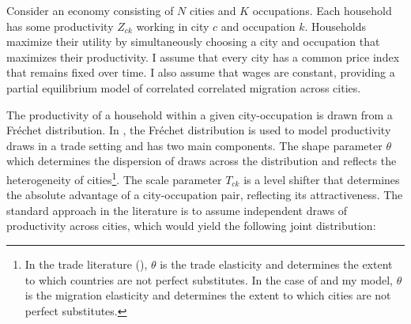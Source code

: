 \documentclass[10pt]{article}
\begin{document}


Consider an economy consisting of $N$ cities and $K$ occupations. Each household has some productivity $Z_{ck}$ working in city $c$ and occupation $k$. Households maximize their utility by simultaneously choosing a city and occupation that maximizes their productivity. I assume that every city has a common price index that remains fixed over time. I also assume that wages are constant, providing a partial equilibrium model of correlated correlated migration across cities.

The productivity of a household within a given city-occupation is drawn from a Fr\'{e}chet distribution. In \cite{redding}, the Fr\'{e}chet distribution is used to model productivity draws in a trade setting and has two main components. The shape parameter $\theta$ which determines the dispersion of draws across the distribution and reflects the heterogeneity of cities\footnote{In the trade literature (\cite{ek}), $\theta$ is the trade elasticity and determines the extent to which countries are not perfect substitutes. In the case of \cite{redding} and my model, $\theta$ is the migration elasticity and determines the extent to which cities are not perfect substitutes.}. The scale parameter $T_{ck}$ is a level shifter that determines the absolute advantage of a city-occupation pair, reflecting its attractiveness. The standard approach in the literature is to assume independent draws of productivity across cities, which would yield the following joint distribution:
\end{document}
